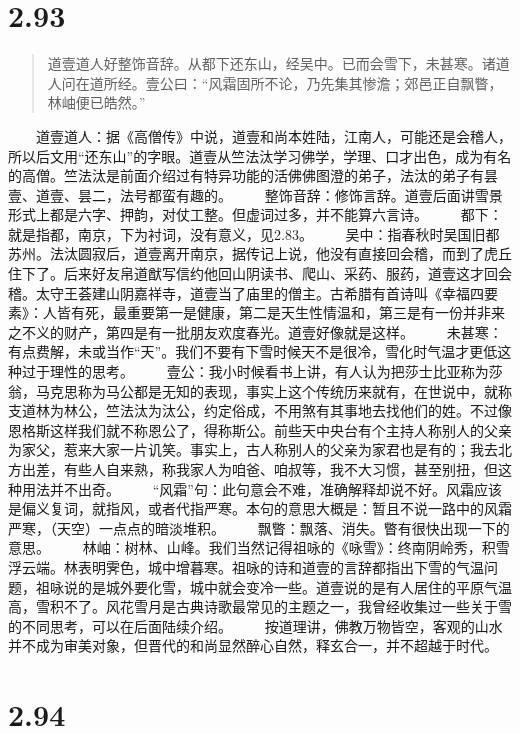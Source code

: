 \documentclass[]{book}
\begin{document}
\section{2.93}\label{section-139}

\begin{quote}
道壹道人好整饰音辞。从都下还东山，经吴中。已而会雪下，未甚寒。诸道人问在道所经。壹公曰：``风霜固所不论，乃先集其惨澹；郊邑正自飘瞥，林岫便已皓然。''
\end{quote}

　　道壹道人：据《高僧传》中说，道壹和尚本姓陆，江南人，可能还是会稽人，所以后文用``还东山''的字眼。道壹从竺法汰学习佛学，学理、口才出色，成为有名的高僧。竺法汰是前面介绍过有特异功能的活佛佛图澄的弟子，法汰的弟子有昙壹、道壹、昙二，法号都蛮有趣的。
　　整饰音辞：修饰言辞。道壹后面讲雪景形式上都是六字、押韵，对仗工整。但虚词过多，并不能算六言诗。
　　都下：就是指都，南京，下为衬词，没有意义，见2.83。
　　吴中：指春秋时吴国旧都苏州。法汰圆寂后，道壹离开南京，据传记上说，他没有直接回会稽，而到了虎丘住下了。后来好友帛道猷写信约他回山阴读书、爬山、采药、服药，道壹这才回会稽。太守王荟建山阴嘉祥寺，道壹当了庙里的僧主。古希腊有首诗叫《幸福四要素》：人皆有死，最重要第一是健康，第二是天生性情温和，第三是有一份并非来之不义的财产，第四是有一批朋友欢度春光。道壹好像就是这样。
　　未甚寒：有点费解，未或当作``天''。我们不要有下雪时候天不是很冷，雪化时气温才更低这种过于理性的思考。
　　壹公：我小时候看书上讲，有人认为把莎士比亚称为莎翁，马克思称为马公都是无知的表现，事实上这个传统历来就有，在世说中，就称支道林为林公，竺法汰为汰公，约定俗成，不用煞有其事地去找他们的姓。不过像恩格斯这样我们就不称恩公了，得称斯公。前些天中央台有个主持人称别人的父亲为家父，惹来大家一片讥笑。事实上，古人称别人的父亲为家君也是有的；我去北方出差，有些人自来熟，称我家人为咱爸、咱叔等，我不大习惯，甚至别扭，但这种用法并不出奇。
　　``风霜''句：此句意会不难，准确解释却说不好。风霜应该是偏义复词，就指风，或者代指严寒。本句的意思大概是：暂且不说一路中的风霜严寒，（天空）一点点的暗淡堆积。
　　飘瞥：飘落、消失。瞥有很快出现一下的意思。
　　林岫：树林、山峰。我们当然记得祖咏的《咏雪》：终南阴岭秀，积雪浮云端。林表明霁色，城中增暮寒。祖咏的诗和道壹的言辞都指出下雪的气温问题，祖咏说的是城外要化雪，城中就会变冷一些。道壹说的是有人居住的平原气温高，雪积不了。风花雪月是古典诗歌最常见的主题之一，我曾经收集过一些关于雪的不同思考，可以在后面陆续介绍。
　　按道理讲，佛教万物皆空，客观的山水并不成为审美对象，但晋代的和尚显然醉心自然，释玄合一，并不超越于时代。　　

\section{2.94}\label{section-140}
\end{document}
